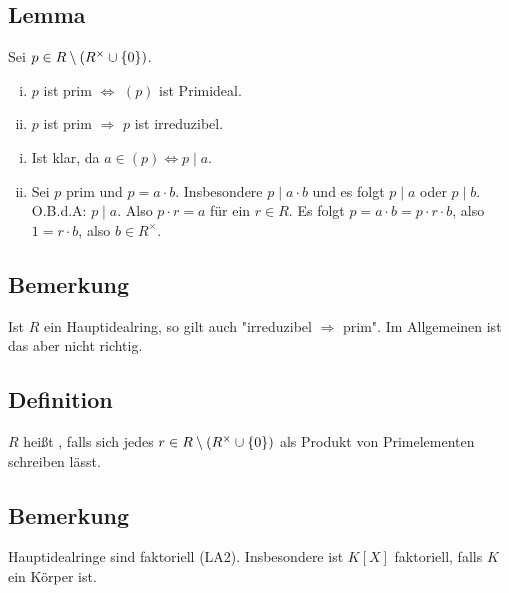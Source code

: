 \subsection[Lemma: Primelemente und Primideale; prim $\Rightarrow $ irreduzibel]{Lemma} %
\label{sub:76}
Sei $p \in R \setminus (R^\times \cup \{0\}) $.
\begin{enumerate}[i)]
	\item $p$ ist prim $\iff$ $(p)$ ist Primideal.
	\item $p$ ist prim $\Longrightarrow$ $p$ ist irreduzibel.
\end{enumerate}
\begin{enumerate}[i)]
	\item Ist klar, da $a \in (p) \iff p \mid a$.
	\item Sei $p$ prim und $p = a \cdot b$. Insbesondere $p \mid a \cdot b$ und es folgt $p \mid a$ oder $p \mid b$. O.B.d.A: $p \mid a$. Also $p \cdot r = a$ für ein 
	$r \in R$. Es folgt $p = a \cdot b = p \cdot r \cdot b$, also $1= r \cdot b$, also $b \in R^\times$. \bewende
\end{enumerate}

\subsection[Bemerkung: In Hauptidealringen ist prim und irreduzibel äquivalent]{Bemerkung} %
\label{sub:77}
Ist $R$ ein Hauptidealring, so gilt auch "{}irreduzibel $\Rightarrow$ prim"{}. Im Allgemeinen ist das aber nicht richtig.

\subsection[Definition: Faktorieller Ring]{Definition} %
\label{sub:78}
$R$ heißt , falls sich jedes $r \in R \setminus (R^\times \cup \{0\}) $ als Produkt von Primelementen schreiben lässt. 

\subsection[Bemerkung: Hauptidealringe sind faktoriell]{Bemerkung} %
\label{sub:79}
Hauptidealringe sind faktoriell (LA2). Insbesondere ist $K[X]$ faktoriell, falls $K$ ein Körper ist.

